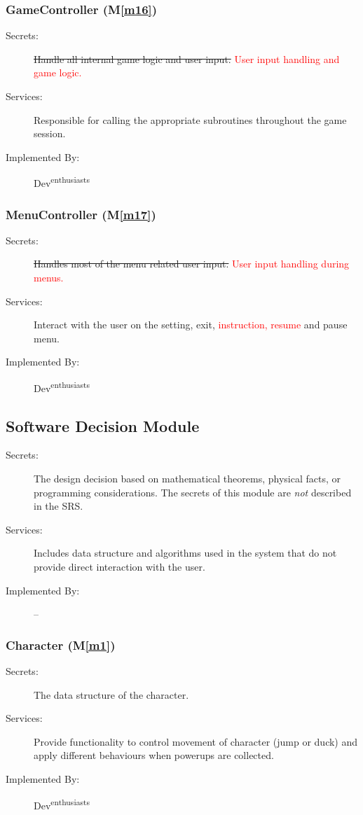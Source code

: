 \documentclass[12pt, titlepage]{article}
\newcommand{\mref}[1]{M\ref{#1}}
\begin{document}
\subsubsection{GameController (\mref{m16})}
\begin{description}
\item[Secrets:] \sout{Handle all internal game logic and user input.} \textcolor{red}{User input handling and game logic.}
\item[Services:] Responsible for calling the appropriate subroutines throughout the game session. 
\item[Implemented By:] Dev\textsuperscript{enthusiasts}
\end{description}

\subsubsection{MenuController (\mref{m17})}
\begin{description}
\item[Secrets:] \sout{Handles most of the menu related user input.} \textcolor{red}{User input handling during menus.}
\item[Services:] Interact with the user on the setting, exit, \textcolor{red}{instruction, resume} and pause menu.
\item[Implemented By:] Dev\textsuperscript{enthusiasts}
\end{description}

\subsection{Software Decision Module}

\begin{description}
\item[Secrets:] The design decision based on mathematical theorems, physical
  facts, or programming considerations. The secrets of this module are
  \emph{not} described in the SRS.
\item[Services:] Includes data structure and algorithms used in the system that
  do not provide direct interaction with the user. 
\item[Implemented By:] --
\end{description}

\subsubsection{Character (\mref{m1})}
\begin{description}
\item[Secrets:] The data structure of the character.
\item[Services:] Provide functionality to control movement of character (jump or duck) and apply different behaviours when powerups are collected.
\item[Implemented By:] Dev\textsuperscript{enthusiasts}
\end{description}
\end{document}
